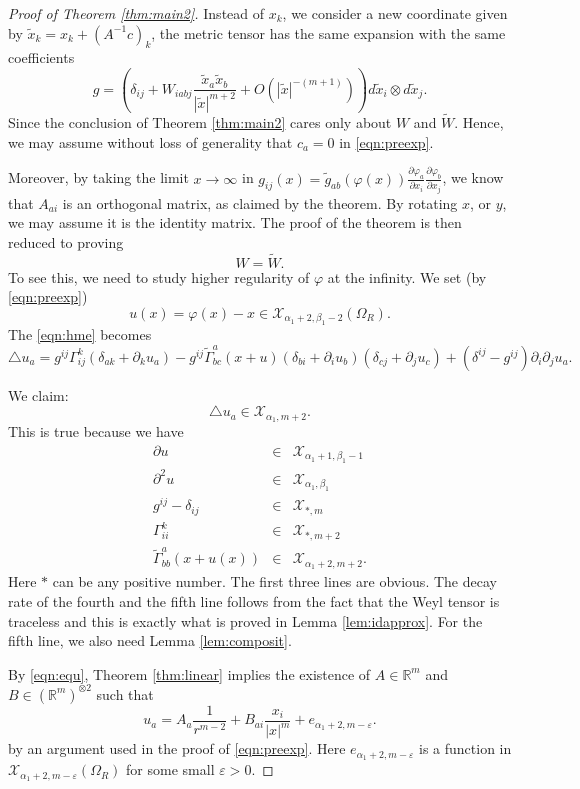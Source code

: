 \documentclass{amsart}
\newcommand{\abs}[1]{\left\vert#1\right\vert}
\newcommand{\Real}{\mathbb R}
\newcommand{\pfrac}[2]{\frac{\partial #1}{\partial #2}}
\numberwithin{equation}{section}
\begin{document}
\begin{proof}[Proof of Theorem \ref{thm:main2}]
	Instead of $x_k$, we consider a new coordinate given by $\tilde{x}_k=x_k + (A^{-1}c)_k$, the metric tensor has the same expansion with the same coefficients
	\[
		g= (\delta_{ij}+W_{iabj}\frac{\tilde{x}_a \tilde{x}_b}{\abs{\tilde{x}}^{m+2}} + O(\abs{\tilde{x}}^{-(m+1)})) d\tilde{x}_i \otimes d\tilde{x}_j.
	\]
	Since the conclusion of Theorem \ref{thm:main2} cares only about $W$ and $\tilde{W}$. Hence, we may assume without loss of generality that $c_a=0$ in \eqref{eqn:preexp}.

	Moreover, by taking the limit $x\to \infty $ in $g_{ij}(x)=\tilde{g}_{ab}(\varphi(x))\pfrac{\varphi_a}{x_i}\pfrac{\varphi_b}{x_j}$, we know that $A_{ai}$ is an orthogonal matrix, as claimed by the theorem. By rotating $x$, or $y$, we may assume it is the identity matrix. The proof of the theorem is then reduced to proving
	\[
		W=\tilde{W}.
	\]
	To see this, we need to study higher regularity of $\varphi$ at the infinity. We set (by \eqref{eqn:preexp})
	\[
		u(x)=\varphi(x)-x \in \mathcal X_{\alpha_1+2,\beta_1-2}(\Omega_R).
	\]
	The \eqref{eqn:hme} becomes
	\begin{equation}
		\label{eqn:u}
		\triangle u_a = g^{ij}\Gamma^k_{ij} (\delta_{ak}+\partial_k u_a)- g^{ij}\tilde{\Gamma}^a_{bc}(x+u) (\delta_{bi}+\partial_i u_b)(\delta_{cj}+\partial_j u_c) +(\delta^{ij}-g^{ij}) \partial_i\partial_j u_a.
	\end{equation}

	We claim:
	\begin{equation}
		\label{eqn:equ}
		\triangle u_a \in \mathcal X_{\alpha_1,m+2}.
	\end{equation}
	This is true because we have
	\begin{eqnarray*}
		\partial u &\in& \mathcal X_{\alpha_1+1,\beta_1-1} \\
		\partial^2 u &\in& \mathcal X_{\alpha_1,\beta_1} \\
		g^{ij}-\delta_{ij} &\in& \mathcal X_{*,m}\\
		\Gamma^k_{ii} &\in& \mathcal X_{*,m+2}\\
		\tilde{\Gamma}^a_{bb}(x+u(x)) &\in& \mathcal X_{\alpha_1+2,m+2}.
	\end{eqnarray*}
	Here $*$ can be any positive number.
	The first three lines are obvious. The decay rate of the fourth and the fifth line follows from the fact that the Weyl tensor is traceless and this is exactly what is proved in Lemma \ref{lem:idapprox}. For the fifth line, we also need Lemma \ref{lem:composit}. 

	By \eqref{eqn:equ}, Theorem \ref{thm:linear} implies the existence of $A\in \Real^m$ and $B\in (\Real^m)^{\otimes 2}$ such that
	\[
		u_a = A_a \frac{1}{r^{m-2}}+ B_{ai} \frac{x_i}{\abs{x}^m}+ e_{\alpha_1+2,m-\varepsilon}.
	\]
	by an argument used in the proof of \eqref{eqn:preexp}. Here $e_{\alpha_1+2,m-\varepsilon}$ is a function in $\mathcal X_{\alpha_1+2,m-\varepsilon}(\Omega_R)$ for some small $\varepsilon>0$.


\end{proof}
\end{document}

